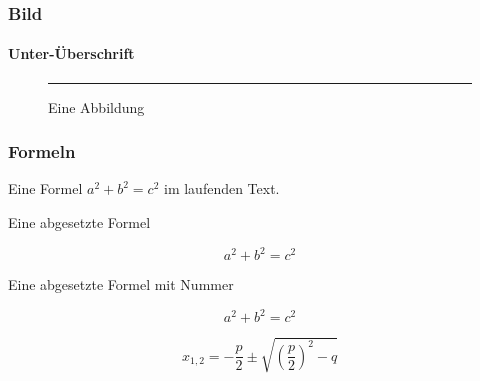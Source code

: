 \documentclass[12pt,ngerman]{beamer}
\begin{document}
\begin{frame}
\frametitle{Bild}
\framesubtitle{Unter-Überschrift}

\begin{center}
\begin{figure}
\rule{\textwidth}{0.5\textwidth}
\caption{Eine Abbildung}
\end{figure}
\end{center}


\end{frame}


\begin{frame}
\frametitle{Formeln}

Eine Formel \(a^2+b^2=c^2\) im laufenden Text.

Eine abgesetzte Formel 

\[a^2+b^2=c^2\]

Eine abgesetzte Formel mit Nummer

\begin{equation}
a^2+b^2=c^2
\end{equation}


\begin{equation}
x_{1, 2} = -\frac{p}{2} \pm \sqrt{ \left(\frac{p}{2}\right)^2 -q }
\end{equation}



\end{frame}
\end{document}
